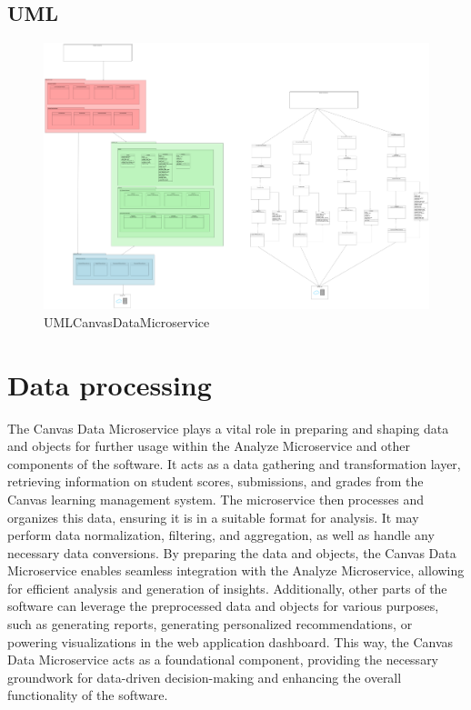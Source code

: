 \documentclass[a4paper, 11pt]{article}
\begin{document}
\subsection{UML}
\begin{figure}[H]
    \includegraphics[width=\linewidth]{UML_CanvasDataMicroservice.png}
    \caption{UMLCanvasDataMicroservice}
    \label{fig:UML}
\end{figure}

\section{Data processing}
The Canvas Data Microservice plays a vital role in preparing and shaping data and objects for further usage within the Analyze Microservice and other components of the software. It acts as a data gathering and transformation layer, retrieving information on student scores, submissions, and grades from the Canvas learning management system. The microservice then processes and organizes this data, ensuring it is in a suitable format for analysis. It may perform data normalization, filtering, and aggregation, as well as handle any necessary data conversions. By preparing the data and objects, the Canvas Data Microservice enables seamless integration with the Analyze Microservice, allowing for efficient analysis and generation of insights. Additionally, other parts of the software can leverage the preprocessed data and objects for various purposes, such as generating reports, generating personalized recommendations, or powering visualizations in the web application dashboard. This way, the Canvas Data Microservice acts as a foundational component, providing the necessary groundwork for data-driven decision-making and enhancing the overall functionality of the software.
\end{document}
